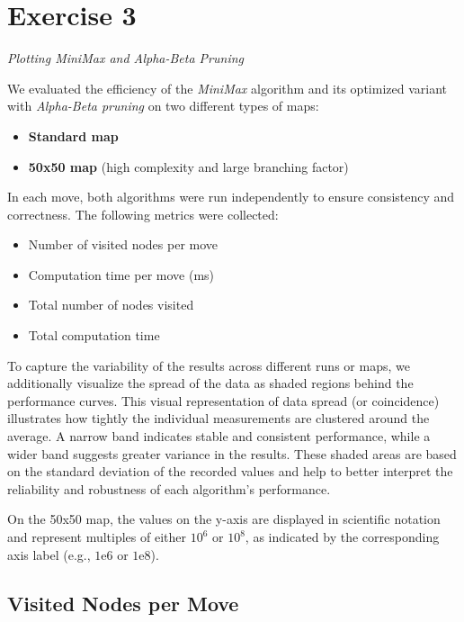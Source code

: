 \section*{Exercise 3}
\textit{Plotting MiniMax and Alpha-Beta Pruning}

\noindent We evaluated the efficiency of the \textit{MiniMax} algorithm and its optimized variant with \textit{Alpha-Beta pruning} on two different types of maps:

\begin{itemize}
    \item \textbf{Standard map}
    \item \textbf{50x50 map} (high complexity and large branching factor)
\end{itemize}

\noindent In each move, both algorithms were run independently to ensure consistency and correctness. The following metrics were collected:
\begin{itemize}
    \item Number of visited nodes per move
    \item Computation time per move (ms)
    \item Total number of nodes visited
    \item Total computation time
\end{itemize}

\noindent To capture the variability of the results across different runs or maps, we additionally visualize the spread of the data as shaded regions behind the performance curves. This visual representation of data spread (or coincidence) illustrates how tightly the individual measurements are clustered around the average. A narrow band indicates stable and consistent performance, while a wider band suggests greater variance in the results. These shaded areas are based on the standard deviation of the recorded values and help to better interpret the reliability and robustness of each algorithm's performance.

\noindent On the 50x50 map, the values on the y-axis are displayed in scientific notation and represent multiples of either $10^6$ or $10^8$, as indicated by the corresponding axis label (e.g., $1\mathrm{e}{6}$ or $1\mathrm{e}{8}$).

\vspace{1em}

\subsection*{Visited Nodes per Move}

